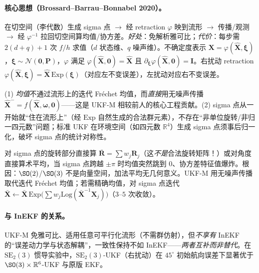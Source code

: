 \paragraph{核心思想（Brossard--Barrau--Bonnabel 2020）。}在切空间（李代数）生成 sigma 点 $\to$ 经 retraction $\varphi$ 映到流形 $\to$ 传播/观测 $\to$ 经 $\varphi^{-1}$ 拉回切空间算均值/协方差\cite{brossard2020ukfm}。\emph{好处}：免解析雅可比；\emph{代价}：每步需 $2(d+q)+1$ 次 $f/h$ 求值（$d$ 状态维、$q$ 噪声维）。不确定度表示 $\mathbf{X}=\varphi(\hat{\mathbf{X}},\boldsymbol{\xi})$，$\boldsymbol{\xi}\sim\mathcal{N}(\mathbf 0,\mathbf{P})$，$\varphi$ 满足 $\varphi(\hat{\mathbf{X}},\mathbf 0)=\hat{\mathbf{X}}$ 且 $\partial_{\boldsymbol{\xi}}\varphi(\hat{\mathbf{X}},\mathbf 0)=\mathbf{I}$。右扰动 retraction $\varphi(\hat{\mathbf{X}},\boldsymbol{\xi})=\hat{\mathbf{X}}\,\mathrm{Exp}(\boldsymbol{\xi})$（对应左不变误差），左扰动对应右不变误差。

\begin{insight}
(1) \emph{均值}不通过流形上的迭代 Fréchet 均值，而\emph{直接}用无噪声传播 $\hat{\mathbf{X}}^-=f(\hat{\mathbf{X}},\boldsymbol{\omega},\mathbf 0)$——这是 UKF-M 相较前人的核心工程贡献\cite{brossard2020ukfm}。(2) sigma 点从一开始就“住在流形上”（经 $\mathrm{Exp}$ 自然生成的合法群元素），不存在“非单位旋转/非归一四元数”问题；标准 UKF 在环境空间（如四元数 $\mathbb{R}^4$）生成 sigma 点须事后归一化，破坏 sigma 点的统计对称性。
\end{insight}

\begin{pitfall}
对 sigma 点的旋转部分直接算 $\bar{\mathbf{R}}=\sum w_j\mathbf{R}_j$（这\emph{不是}合法旋转矩阵！）或对角度直接算术平均，当 sigma 点跨越 $\pm\pi$ 时均值突然跳到 $0$、协方差特征值爆炸。根因：$\SO(2)$/$\SO(3)$ 不是向量空间，加法平均无几何意义。UKF-M 用无噪声传播取代迭代 Fréchet 均值；若需精确均值，对 sigma 点迭代 $\bar{\mathbf{X}}\leftarrow\bar{\mathbf{X}}\,\mathrm{Exp}\big(\sum w_j\mathrm{Log}(\bar{\mathbf{X}}^{-1}\mathbf{X}_j)\big)$（$3$--$5$ 次收敛）。
\end{pitfall}

\paragraph{与 InEKF 的关系。}UKF-M 免雅可比、适用任意可平行化流形（不需群仿射），但\emph{不享有} InEKF 的“误差动力学与状态解耦”，一致性保持不如 InEKF——\emph{两者互补而非替代}。在 $\mathrm{SE}_2(3)$ 惯导实验中，$\mathrm{SE}_2(3)$-UKF（右扰动）在 $45^\circ$ 初始航向误差下显著优于 $\SO(3)\times\mathbb{R}^6$-UKF 与原版 EKF\cite{brossard2020ukfm}。

